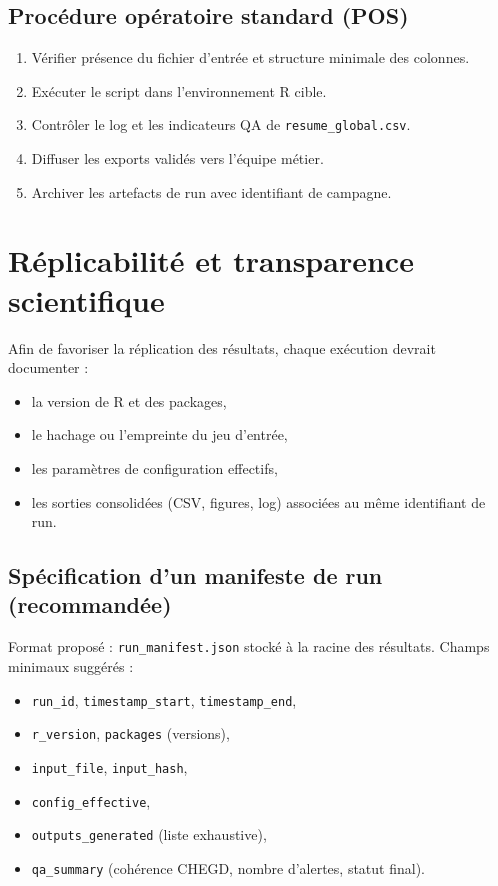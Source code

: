 \documentclass[11pt,a4paper]{article}
\begin{document}
\subsection{Proc\'edure op\'eratoire standard (POS)}
\begin{enumerate}[leftmargin=1.2cm]
  \item V\'erifier pr\'esence du fichier d'entr\'ee et structure minimale des colonnes.
  \item Ex\'ecuter le script dans l'environnement R cible.
  \item Contrôler le log et les indicateurs QA de \texttt{resume\_global.csv}.
  \item Diffuser les exports valid\'es vers l'\'equipe m\'etier.
  \item Archiver les artefacts de run avec identifiant de campagne.
\end{enumerate}

\section{R\'eplicabilit\'e et transparence scientifique}
Afin de favoriser la r\'eplication des r\'esultats, chaque ex\'ecution devrait documenter :
\begin{itemize}[leftmargin=1.2cm]
  \item la version de R et des packages,
  \item le hachage ou l'empreinte du jeu d'entr\'ee,
  \item les paramètres de configuration effectifs,
  \item les sorties consolid\'ees (CSV, figures, log) associ\'ees au même identifiant de run.
\end{itemize}

\subsection{Sp\'ecification d'un manifeste de run (recommand\'ee)}
Format propos\'e : \texttt{run\_manifest.json} stock\'e à la racine des r\'esultats.
Champs minimaux sugg\'er\'es :
\begin{itemize}[leftmargin=1.2cm]
  \item \texttt{run\_id}, \texttt{timestamp\_start}, \texttt{timestamp\_end},
  \item \texttt{r\_version}, \texttt{packages} (versions),
  \item \texttt{input\_file}, \texttt{input\_hash},
  \item \texttt{config\_effective},
  \item \texttt{outputs\_generated} (liste exhaustive),
  \item \texttt{qa\_summary} (coh\'erence CHEGD, nombre d'alertes, statut final).
\end{itemize}
\end{document}
